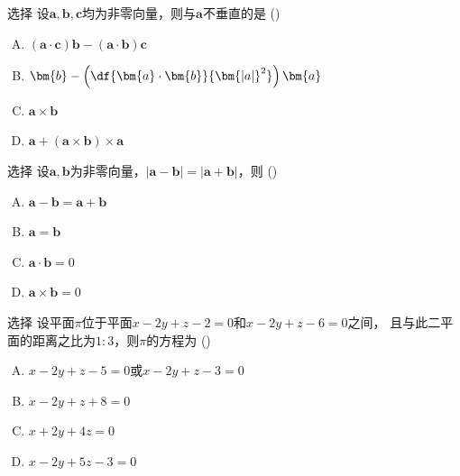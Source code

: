 \begin{frame}{选择}
	\linespread{1.3}
	\;设$\bm{a},\bm{b},\bm{c}$均为非零向量，则与$\bm{a}$不垂直的是
	(\underline{\;})
	\begin{enumerate}[(A)]
	  \item $(\bm{a}\cdot\bm{c})\bm{b}-(\bm{a}\cdot\bm{b})\bm{c}$
	  \item $\bm{b}-\left(\df{\bm{a}\cdot\bm{b}}{\bm{|a|}^2}\right)\bm{a}$
	  \item $\bm{a}\times\bm{b}$
	  \item $\bm{a}+(\bm{a}\times\bm{b})\times\bm{a}$
	\end{enumerate}
\end{frame}

\begin{frame}{选择}
	\linespread{1.3}
	\;设$\bm{a},\bm{b}$为非零向量，$|\bm{a}-\bm{b}|=|\bm{a}+\bm{b}|$，则
	(\underline{\;})
	\begin{enumerate}[(A)]
	  \item $\bm{a}-\bm{b}=\bm{a}+\bm{b}$
	  \item $\bm{a}=\bm{b}$
	  \item $\bm{a}\cdot\bm{b}=0$
	  \item $\bm{a}\times\bm{b}=0$
	\end{enumerate}
\end{frame}


\begin{frame}{选择}
	\linespread{1.3}
	\;设平面$\pi$位于平面$x-2y+z-2=0$和$x-2y+z-6=0$之间，
	且与此二平面的距离之比为$1:3$，则$\pi$的方程为
	(\underline{\;})
	\begin{enumerate}[(A)]
	  \item $x-2y+z-5=0$或$x-2y+z-3=0$
	  \item $x-2y+z+8=0$
	  \item $x+2y+4z=0$
	  \item $x-2y+5z-3=0$
	\end{enumerate}
\end{frame}

